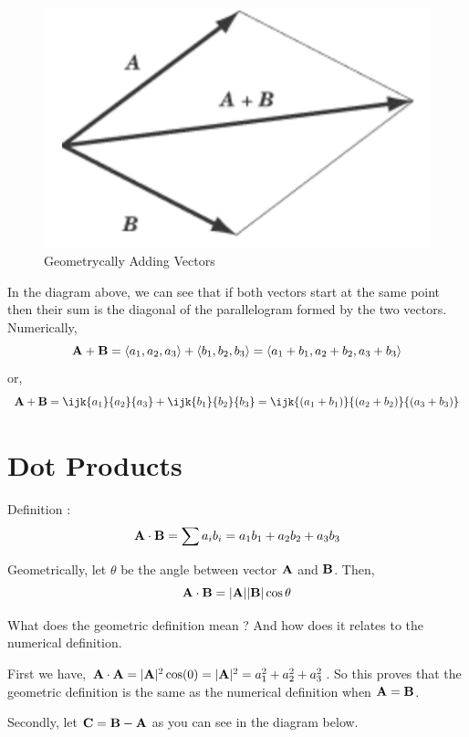\begin{figure}[ht!]
    \centering
    \includegraphics[scale=0.5]{./images/lecture_1_figure_1.png}
    \caption{Geometrycally Adding Vectors}
\end{figure}

In the diagram above, we can see that if both vectors start at the same point then their sum is the diagonal of the parallelogram formed by the two vectors.
Numerically, $$ {\bf A} + {\bf B} = \left< a_1, a_2, a_3 \right> + \left< b_1, b_2, b_3 \right> = \left< a_1 + b_1, a_2 + b_2, a_3 + b_3 \right> $$
or,
$$ {\bf A} + {\bf B} = \ijk{a_1}{a_2}{a_3} + \ijk{b_1}{b_2}{b_3} = \ijk{(a_1 + b_1)}{(a_2 + b_2)}{(a_3 + b_3)} $$


\section{Dot Products}

Definition : 
$$
{\bf A} \cdot {\bf B} = \sum a_i b_i = a_1 b_1 + a_2 b_2 + a_3 b_3
$$

Geometrically, let $\theta$ be the angle between vector ${\bf A}$ and ${\bf B}$. Then, 
$$ {\bf A} \cdot {\bf B} = |{\bf A}||{\bf B}| \cos \theta  $$

What does the geometric definition mean ? And how does it relates to the numerical definition. 

First we have, ${\bf A} \cdot {\bf A} = |{\bf A}|^2 \cos(0) = |{\bf A}|^2 = a_1^2 + a_2^2 + a_3^2 $. 
So this proves that the geometric definition is the same as the numerical definition when ${\bf A} = {\bf B}$.

Secondly, let ${\bf C} = {\bf B} - {\bf A}$ as you can see in the diagram below.

